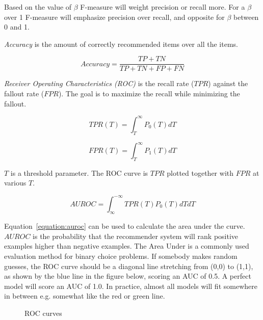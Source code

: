 Based on the value of $\beta$ F-measure will weight precision or recall more.
For a $\beta$ over 1 F-measure will emphasize precision over recall, and
opposite for $\beta$ between 0 and 1.

\textit{Accuracy} is the amount of correctly recommended items over all the
items.

\begin{equation}
    Accuracy = \frac{TP+TN}{TP+TN+FP+FN}
    \label{equation:accuracy}
\end{equation}

\textit{Receiver Operating Characteristics (ROC)} is the recall rate ($TPR$)
against the fallout rate ($FPR$).  The goal is to maximize the recall while
minimizing the fallout.

\begin{equation}
    TPR(T) = \int_T^\infty P_0(T)dT
    \label{equation:tpr}
\end{equation}

\begin{equation}
    FPR(T) = \int_T^\infty P_1(T)dT
    \label{equation:fpr}
\end{equation}

$T$ is a threshold parameter.  The ROC curve is $TPR$ plotted together with
$FPR$ at various $T$.

\begin{equation}
    AUROC = \int_\infty^{-\infty} TPR(T)P_0(T)dTdT
    \label{equation:auroc}
\end{equation}

Equation~\ref{equation:auroc} can be used to calculate the area under the
curve.  $AUROC$ is the probability that the recommender system will rank
positive examples higher than negative examples.  The Area Under is a commonly
used evaluation method for binary choice problems. If somebody makes random
guesses, the ROC curve should be a diagonal line stretching from (0,0) to
(1,1), as shown by the blue line in the figure below, scoring an AUC of 0.5. A
perfect model will score an AUC of 1.0. In practice, almost all models will fit
somewhere in between e.g. somewhat like the red or green line.

\begin{figure}[H]
\label{fig:aucroc}
  \centering
    \caption{ROC curves}
\end{figure}

